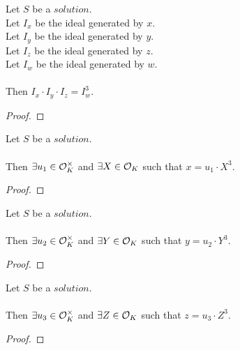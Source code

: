 \begin{lemma}
    \label{lmm:span_x_mul_span_y_mul_span_z}
    \leanok
    Let $S$ be a $solution$.\\
    Let $I_x$ be the ideal generated by $x$. \\
    Let $I_y$ be the ideal generated by $y$. \\
    Let $I_z$ be the ideal generated by $z$. \\
    Let $I_w$ be the ideal generated by $w$. \\\\
    Then $I_x \cdot I_y \cdot I_z = I_w^3$.
\end{lemma}
\begin{proof}
    \leanok
\end{proof}

\begin{lemma}
    \label{lmm:x_eq_unit_mul_cube}
    \leanok
    Let $S$ be a $solution$.\\\\
    Then $\exists u_1 \in \mathcal{O}^\times_K$ and $\exists X \in \mathcal{O}_K$
    such that $x = u_1 \cdot X^3$.
\end{lemma}
\begin{proof}
    \leanok
\end{proof}

\begin{lemma}
    \label{lmm:y_eq_unit_mul_cube}
    \leanok
    Let $S$ be a $solution$.\\\\
    Then $\exists u_2 \in \mathcal{O}^\times_K$ and $\exists Y \in \mathcal{O}_K$
    such that $y = u_2 \cdot Y^3$.
\end{lemma}
\begin{proof}
    \leanok
\end{proof}

\begin{lemma}
    \label{lmm:z_eq_unit_mul_cube}
    \leanok
    Let $S$ be a $solution$.\\\\
    Then $\exists u_3 \in \mathcal{O}^\times_K$ and $\exists Z \in \mathcal{O}_K$
    such that $z = u_3 \cdot Z^3$.
\end{lemma}
\begin{proof}
    \leanok
\end{proof}

